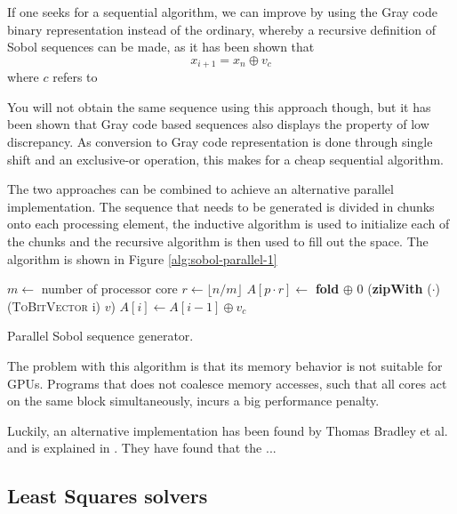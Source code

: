 If one seeks for a sequential algorithm, we can improve by 
using the Gray code binary representation instead of the ordinary,
whereby a recursive definition of Sobol sequences can be made, as it
has been shown that
$$x_{i+1} = x_n \oplus v_c$$
where $c$ refers to 

You will not obtain the same sequence using this approach though, but
it has been shown  that Gray code based sequences also
displays the property of low discrepancy. As conversion to Gray code
representation is done through single shift and an exclusive-or
operation, this makes for a cheap sequential algorithm.

The two approaches can be combined to achieve an alternative parallel
implementation. The sequence that needs to be generated is divided in
chunks onto each processing element, the inductive algorithm is used
to initialize each of the chunks and the recursive algorithm is then
used to fill out the space. The algorithm is shown in Figure \ref{alg:sobol-parallel-1}

\begin{algorithm}
  \begin{algorithmic}
    \State $m \gets$ number of processor core
    \State $r \gets \lfloor n/m \rfloor$
    \State $A[p\cdot r] \gets$ \textbf{fold} $\oplus$ 0 (\textbf{zipWith} ($\cdot$) (\textsc{ToBitVector} i) $v$)
    \State $A[i] \gets A[i - 1] \oplus v_c$ 
    \EndFor
    \EndParFor
    \EndFunction
  \end{algorithmic}
  \caption{Parallel Sobol sequence generator.}
  \label{alg:sobol-parallel-1}
\end{algorithm}

The problem with this algorithm is that its memory behavior is not
suitable for GPUs. Programs that does not coalesce memory accesses,
such that all cores act on the same block simultaneously, incurs a big
performance penalty. 

Luckily, an alternative implementation has been found by Thomas
Bradley et al. and is explained in . They have found that the
...


\subsection{Least Squares solvers}

